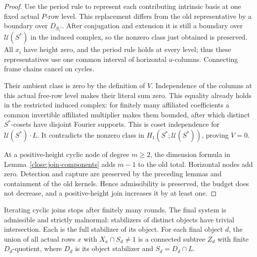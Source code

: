 \begin{proof}
Use the period rule to represent each contributing intrinsic basis
at one fixed actual $P$-row level. This replacement differs from the
old representative by a boundary over $D_{S_i'}$. After conjugation
and extension it is still a boundary over $\mathcal U(S^*)$ in the
induced complex, so the nonzero class just obtained is preserved.
All $x_i$ have height zero, and the period rule holds at every level;
thus these representatives use one common interval of horizontal
$a$-columns. Connecting frame chains cancel on cycles.

Their ambient class is zero by the definition of $V$. Independence
of the columns at this actual free-row level makes their literal
sum zero. This equality already holds in the restricted induced
complex: for finitely many affiliated coefficients a common
invertible affiliated multiplier makes them bounded, after which
distinct $S^*$-cosets have disjoint Fourier supports. This is coset
independence for $\mathcal U(S^*)\cdot L$. It contradicts the
nonzero class in $H_1(S^*;\mathcal U(S^*))$, proving $V=0$.

At a positive-height cyclic node of degree $m\ge2$, the dimension
formula in Lemma~\ref{close:join-components} adds $m-1$ to the old
total. Horizontal nodes add zero. Detection and capture are preserved
by the preceding lemmas and containment of the old kernels. Hence
admissibility is preserved, the budget does not decrease, and a
positive-height join increases it by at least one.
\end{proof}

\begin{proposition}\label{close:strict-system}
Iterating cyclic joins stops after finitely many rounds. The final
system is admissible and strictly malnormal: stabilizers of distinct
objects have trivial intersection. Each is the full stabilizer of its
object. For each final object $d$, the union of all actual rows $x$
with $X_x\cap S_d\ne1$ is a connected subtree $Z_d$ with finite
$D_d$-quotient, where $D_d$ is its object stabilizer and $S_d=D_d\cap L$.
\end{proposition}


